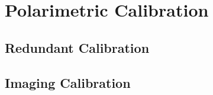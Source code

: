 \chapter{Polarimetric Calibration}
\label{chapter:polcal}

\section{Redundant Calibration}

\section{Imaging Calibration}
